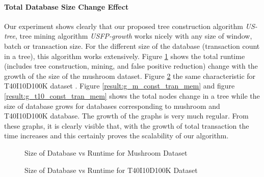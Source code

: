     \paragraph{Total Database Size Change Effect}Our experiment shows clearly that our proposed tree construction algorithm \emph{US-tree}, tree mining algorithm \emph{USFP-growth} works nicely with any size of window, batch or transaction size. For the different size of the database (transaction count in a tree), this algorithm works extensively. Figure \ref{result:g_m_const_tran} shows the total runtime (includes tree construction, mining, and false positive reduction) change with the growth of the size of the mushroom dataset. Figure \ref{result:g_t10_const_tran} the same characteristic for T40I10D100K dataset . Figure \ref{result:g_m_const_tran_mem} and figure \ref{result:g_t10_const_tran_mem} shows the total nodes change in a tree while the size of database grows for databases corresponding to mushroom and T40I10D100K database. The growth of the graphs is very much regular. From these graphs, it is clearly visible that, with the growth of total transaction the time increases and this certainly proves the scalability of our algorithm. 
        \begin{figure}[h]
        \centering
            
        \caption{Size of Database vs Runtime for Mushroom Dataset }
        \label{result:g_m_const_tran}
        \end{figure}
        \begin{figure}[h]
        \centering
            
        \caption{Size of Database vs Runtime for T40I10D100K Dataset }
        \label{result:g_t10_const_tran}
        \end{figure}
%            
